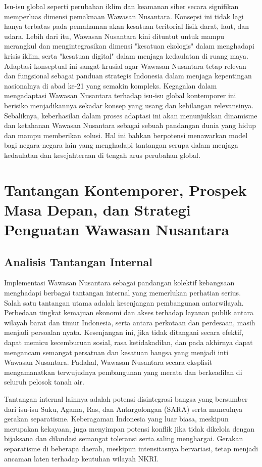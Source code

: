 \documentclass[12pt, a4paper]{article}
\begin{document}
Isu-isu global seperti perubahan iklim dan keamanan siber secara signifikan memperluas dimensi pemaknaan Wawasan Nusantara. Konsepsi ini tidak lagi hanya terbatas pada pemahaman akan kesatuan teritorial fisik darat, laut, dan udara. Lebih dari itu, Wawasan Nusantara kini dituntut untuk mampu merangkul dan mengintegrasikan dimensi "kesatuan ekologis" dalam menghadapi krisis iklim, serta "kesatuan digital" dalam menjaga kedaulatan di ruang maya. Adaptasi konseptual ini sangat krusial agar Wawasan Nusantara tetap relevan dan fungsional sebagai panduan strategis Indonesia dalam menjaga kepentingan nasionalnya di abad ke-21 yang semakin kompleks. Kegagalan dalam mengadaptasi Wawasan Nusantara terhadap isu-isu global kontemporer ini berisiko menjadikannya sekadar konsep yang usang dan kehilangan relevansinya. Sebaliknya, keberhasilan dalam proses adaptasi ini akan menunjukkan dinamisme dan ketahanan Wawasan Nusantara sebagai sebuah pandangan dunia yang hidup dan mampu memberikan solusi. Hal ini bahkan berpotensi menawarkan model bagi negara-negara lain yang menghadapi tantangan serupa dalam menjaga kedaulatan dan kesejahteraan di tengah arus perubahan global.
\section{Tantangan Kontemporer, Prospek Masa Depan, dan Strategi Penguatan Wawasan Nusantara}
\subsection*{Analisis Tantangan Internal}

Implementasi Wawasan Nusantara sebagai pandangan kolektif kebangsaan menghadapi berbagai tantangan internal yang memerlukan perhatian serius. Salah satu tantangan utama adalah kesenjangan pembangunan antarwilayah. Perbedaan tingkat kemajuan ekonomi dan akses terhadap layanan publik antara wilayah barat dan timur Indonesia, serta antara perkotaan dan perdesaan, masih menjadi persoalan nyata. Kesenjangan ini, jika tidak ditangani secara efektif, dapat memicu kecemburuan sosial, rasa ketidakadilan, dan pada akhirnya dapat mengancam semangat persatuan dan kesatuan bangsa yang menjadi inti Wawasan Nusantara. Padahal, Wawasan Nusantara secara eksplisit mengamanatkan terwujudnya pembangunan yang merata dan berkeadilan di seluruh pelosok tanah air.  

Tantangan internal lainnya adalah potensi disintegrasi bangsa yang bersumber dari isu-isu Suku, Agama, Ras, dan Antargolongan (SARA) serta munculnya gerakan separatisme. Keberagaman Indonesia yang luar biasa, meskipun merupakan kekayaan, juga menyimpan potensi konflik jika tidak dikelola dengan bijaksana dan dilandasi semangat toleransi serta saling menghargai. Gerakan separatisme di beberapa daerah, meskipun intensitasnya bervariasi, tetap menjadi ancaman laten terhadap keutuhan wilayah NKRI.  
\end{document}
